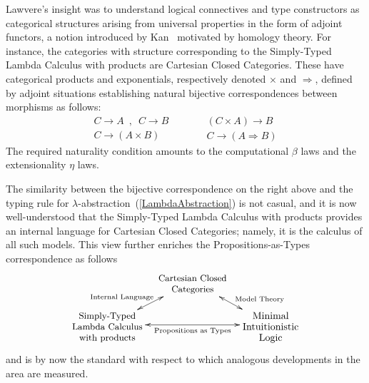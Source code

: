 \documentclass[11pt,twocolumn]{article}
\newcommand{\vfigspace}[1]{}%
\begin{document}
Lawvere's insight was to understand logical connectives and type
constructors as categorical structures arising from universal properties
in the form of adjoint functors, a notion introduced by Kan~\cite{Kan}
motivated by homology theory.  For instance, the categories with structure
corresponding to the Simply-Typed Lambda Calculus with products are
Cartesian Closed Categories.  These have categorical products and
exponentials, respectively denoted $\times$ and $\Rightarrow$, defined by
adjoint situations establishing natural bijective correspondences between
morphisms as follows:
\[
  \begin{array}{c}
    C\to A \enspace,\enspace C\to B
    \\ \hline\hline
    C\to (A\times B)
  \end{array}
  \quad\qquad
  \begin{array}{c}
    (C\times A)\to B
    \\ \hline\hline
    C\to (A\Rightarrow B)
  \end{array}
\]
The required naturality condition amounts to the computational $\beta$
laws and the extensionality $\eta$ laws.

The similarity between the bijective correspondence on the right above and the
typing rule for \mbox{$\lambda$-abstraction}~(\ref{LambdaAbstraction}) is not
casual, and it is now well-understood that the Simply-Typed Lambda Calculus
with products provides an internal language for Cartesian Closed Categories;
namely, it is the calculus of all such models.  This view further enriches the
Propositions-as-Types correspondence as 
follows %
\[\xymatrix@C=10pt@R=12.5pt{
    & \ar@{<->}[dl]_(.5){\null\hspace*{-15mm}\txt{\scriptsize Internal
        Language}} 
    \ar@{<->}[dr]^(.55){\null\hspace*{4mm}\txt{\scriptsize Model Theory}}
    \txt{\small Cartesian Closed\\ \small Categories} & \\
    \txt{\small Simply-Typed\\ \small Lambda Calculus\\ \small with products}
    \ar@{<->}[rr]_-{\txt{\scriptsize Propositions as Types}} & & 
    \txt{Minimal\\ Intuitionistic\\ Logic}
  }\]
and is by now the standard with respect to which analogous developments in the
area are measured.  
\end{document}
